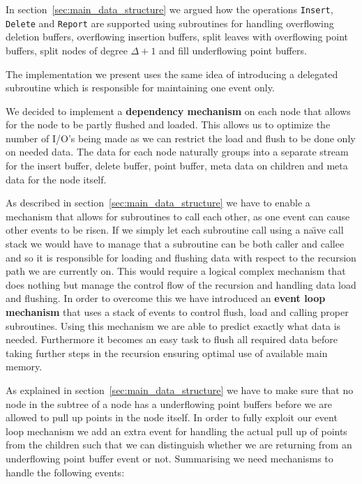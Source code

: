 \documentclass[twoside,11pt,openright]{report}
\begin{document}
In section~\ref{sec:main_data_structure} we argued how the operations \texttt{Insert}, \texttt{Delete} and \texttt{Report} are supported using subroutines for handling overflowing deletion buffers, overflowing insertion buffers, split leaves with overflowing point buffers, split nodes of degree $\Delta+1$ and fill underflowing point buffers.

The implementation we present uses the same idea of introducing a delegated subroutine which is responsible for maintaining one event only.

We decided to implement a \textbf{dependency mechanism} on each node that allows for the node to be partly flushed and loaded. This allows us to optimize the number of I/O's being made as we can restrict the load and flush to be done only on needed data. The data for each node naturally groups into a separate stream for the insert buffer, delete buffer, point buffer, meta data on children and meta data for the node itself. %

As described in section~\ref{sec:main_data_structure} we have to enable a mechanism that allows for subroutines to call each other, as one event can cause other events to be risen. If we simply let each subroutine call using a na\"{\i}ve call stack we would have to manage that a subroutine can be both caller and callee and so it is responsible for loading and flushing data with respect to the recursion path we are currently on. This would require a logical complex mechanism that does nothing but manage the control flow of the recursion and handling data load and flushing. In order to overcome this we have introduced an \textbf{event loop mechanism} that uses a stack of events to control flush, load and calling  proper subroutines. Using this mechanism we are able to predict exactly what data is needed. Furthermore it becomes an easy task to flush all required data before taking further steps in the recursion ensuring optimal use of available main memory.

As explained in section~\ref{sec:main_data_structure} we have to make sure that no node in the subtree of a node has a underflowing point buffers before we are allowed to pull up points in the node itself. In order to fully exploit our event loop mechanism we add an extra event for handling the actual pull up of points from the children such that we can distinguish whether we are returning from an underflowing point buffer event or not. Summarising we need mechanisms to handle the following events:
\end{document}
